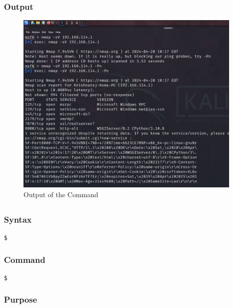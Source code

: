 \documentclass[11pt]{article}
\begin{document}
\subsubsection*{Output}
\begin{figure}[H]
    \centering
    \includegraphics[width=0.99\textwidth]{a3_ss (16).png}
    \caption{Output of the Command}
\end{figure}
\subsection{}

\subsubsection*{Syntax}
\begin{verbatim}
$
\end{verbatim}

\subsubsection*{Command}
\begin{verbatim}
$
\end{verbatim}

\subsubsection*{Purpose}
\end{document}
